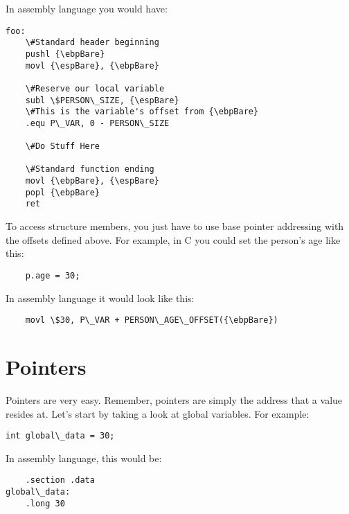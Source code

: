 In assembly language you would have:

\begin{simpletyping}
\begin{lstlisting}
foo:
	\#Standard header beginning
	pushl {\ebpBare}
	movl {\espBare}, {\ebpBare}

	\#Reserve our local variable
	subl \$PERSON\_SIZE, {\espBare} 
	\#This is the variable's offset from {\ebpBare}
	.equ P\_VAR, 0 - PERSON\_SIZE

	\#Do Stuff Here

	\#Standard function ending
	movl {\ebpBare}, {\espBare}
	popl {\ebpBare}
	ret
\end{lstlisting}
\end{simpletyping}

To access structure members, you just have to use base pointer addressing with 
the offsets defined above.  For example,
in C you could set the person's age like this:

\begin{simpletyping}
\begin{lstlisting}
	p.age = 30;
\end{lstlisting}
\end{simpletyping}

In assembly language it would look like this:

\begin{simpletyping}
\begin{lstlisting}
	movl \$30, P\_VAR + PERSON\_AGE\_OFFSET({\ebpBare})
\end{lstlisting}
\end{simpletyping}

\section{Pointers}

Pointers are very easy.  Remember, pointers are simply the
address that a value resides at.  Let's start by taking a
look at global variables.  For example:

\begin{simpletyping}
\begin{lstlisting}
int global\_data = 30;
\end{lstlisting}
\end{simpletyping}

In assembly language, this would be:

\begin{simpletyping}
\begin{lstlisting}
	.section .data
global\_data:
	.long 30
\end{lstlisting}
\end{simpletyping}

